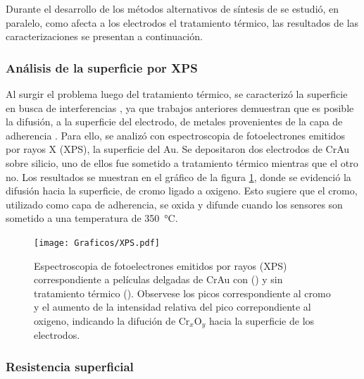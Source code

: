 {  			Durante el desarrollo de los métodos alternativos de síntesis de \pdm\space se estudió, en paralelo, como afecta a los electrodos el tratamiento térmico, las resultados de las caracterizaciones se presentan a continuación.
			
		\subsubsection{Análisis de la superficie por XPS}

			Al surgir el problema luego del tratamiento térmico, se caracterizó la superficie en busca de interferencias , ya que trabajos anteriores demuestran que es posible la difusión, a la superficie del electrodo, de metales provenientes de la capa de adherencia \cite{Alonso1990,Moody2003}. Para ello, se analizó con espectroscopia de fotoelectrones emitidos por rayos X (XPS), la superficie del Au. Se depositaron dos electrodos de Cr\textbar Au sobre silicio, uno de ellos fue sometido a tratamiento térmico mientras que el otro no. Los resultados se muestran en el gráfico de la figura \ref{fig:XPS}, donde se evidenció la difusión hacia la superficie, de cromo ligado a oxigeno. Esto sugiere que el cromo, utilizado como capa de adherencia, se oxida y difunde cuando los sensores son sometido a una temperatura de \SI{350}{\celsius}.

				\begin{figure}[ht!]
		 	       	\begin{center}
		 	       	\texttt{[image: Graficos/XPS.pdf]}
		        	\caption[XPS de peliculas delgadas de Cr\textbar Au]{Espectroscopia de fotoelectrones emitidos por rayos (XPS) correspondiente a películas delgadas de Cr\textbar Au con (\usebox{\rojo}) y sin tratamiento térmico  (\usebox{\marron}). Observese los picos correspondiente al cromo y el aumento de la intensidad relativa del pico correpondiente al oxigeno, indicando la difución de Cr$_x$O$_y$ hacia la superficie de los electrodos.}
		         	\label{fig:XPS}
		         	\end{center}
		     		\end{figure}
		
		\subsubsection{Resistencia superficial}

}
